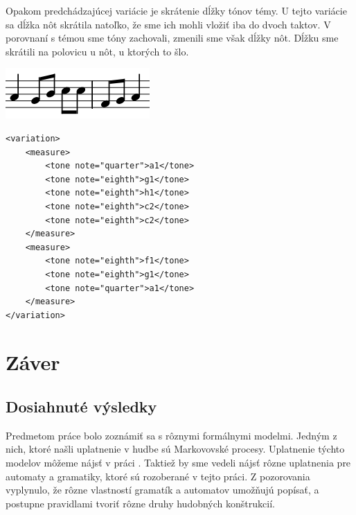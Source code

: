 Opakom predchádzajúcej variácie je skrátenie dĺžky tónov témy. U tejto variácie sa dĺžka nôt skrátila natoľko, že sme ich mohli vložiť iba do dvoch taktov. V porovnaní s témou sme tóny zachovali, zmenili sme však dĺžky nôt. Dĺžku sme skrátili na polovicu u nôt, u ktorých to šlo.

\begin{minipage}{.45\textwidth}
\includegraphics[width=\textwidth]{thesis/obrazky-figures/var9.png}
\end{minipage}%
\begin{minipage}{.5\textwidth}
\centering
\lstset{language=XML}
\begin{lstlisting}[basicstyle=\tiny]
<variation>
    <measure>
        <tone note="quarter">a1</tone>
        <tone note="eighth">g1</tone>
        <tone note="eighth">h1</tone>
        <tone note="eighth">c2</tone>
        <tone note="eighth">c2</tone>
    </measure>
    <measure>
        <tone note="eighth">f1</tone>
        <tone note="eighth">g1</tone>
        <tone note="quarter">a1</tone>
    </measure>
</variation>
\end{lstlisting}
\end{minipage}

\chapter{Záver}
\label{chap:end}
\section{Dosiahnuté výsledky}
Predmetom práce bolo zoznámiť sa s rôznymi formálnymi modelmi. Jedným z nich, ktoré našli uplatnenie v hudbe sú Markovovské procesy. Uplatnenie týchto modelov môžeme nájsť v práci \cite{afrpub}. Taktiež by sme vedeli nájsť rôzne uplatnenia pre automaty a gramatiky, ktoré sú rozoberané v tejto práci. Z pozorovania vyplynulo, že rôzne vlastností gramatík a automatov umožňujú popísať, a postupne pravidlami tvoriť rôzne druhy hudobných konštrukcií.

